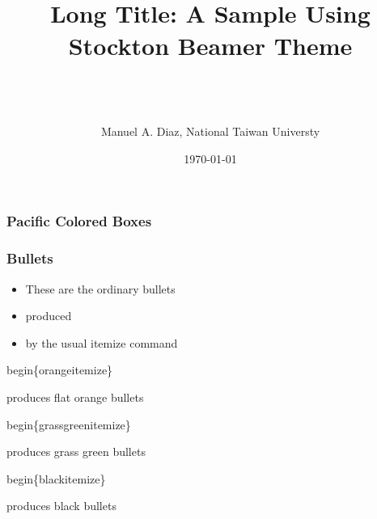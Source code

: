 

\title[Short Title \hspace{4em}\insertframenumber/
\inserttotalframenumber]{~ \\ Long Title:  A Sample Using \\ Stockton Beamer Theme \\~} %
\author[M. A. Diaz]{ \\ Manuel A. Diaz, National Taiwan Universty } %
\date{\today}



\begin{frame}

\maketitle
\end{frame}

\begin{frame}
\frametitle{Pacific Colored Boxes}






\end{frame}


\begin{frame}\frametitle{Bullets}

\begin{itemize}
\item These are the ordinary bullets
\item produced
\item by the usual itemize command
\end{itemize} 

\begin{orangeitemize}
\item  begin\{orangeitemize\}
\item produces flat orange bullets
\end{orangeitemize}

\begin{grassgreenitemize}
\item begin\{grassgreenitemize\}
\item produces grass green bullets
\end{grassgreenitemize}

\begin{blackitemize}
\item begin\{blackitemize\}
\item produces black bullets
\end{blackitemize}
\end{frame}

